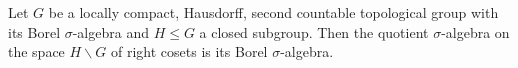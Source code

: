 Let $G$ be a locally compact, Hausdorff, second countable topological group with its Borel $\sigma$-algebra and $H\le G$ a
closed subgroup. Then the quotient $\sigma$-algebra on the space $H\backslash G$ of right cosets is its Borel $\sigma$-algebra.
